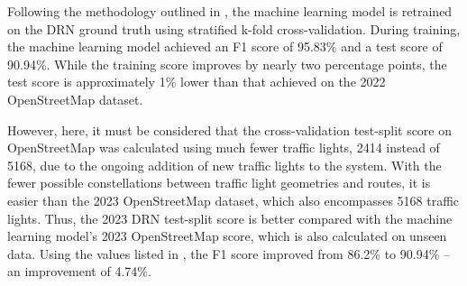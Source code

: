 \begin{table}[b]
\caption{Achieved model scores after retraining on DRN compared to preliminary results from . Cross-validation scores on unseen data are also highlighted.}
\label{tab:model-scores-drn}
\end{table}

Following the methodology outlined in , the machine learning model is retrained on the DRN ground truth using stratified k-fold cross-validation. During training, the machine learning model achieved an F1 score of 95.83\% and a test score of 90.94\%. While the training score improves by nearly two percentage points, the test score is approximately 1\% lower than that achieved on the 2022 OpenStreetMap dataset. 

However, here, it must be considered that the cross-validation test-split score on OpenStreetMap was calculated using much fewer traffic lights, 2414 instead of 5168, due to the ongoing addition of new traffic lights to the system. With the fewer possible constellations between traffic light geometries and routes, it is easier than the 2023 OpenStreetMap dataset, which also encompasses 5168 traffic lights. Thus, the 2023 DRN test-split score is better compared with the machine learning model's 2023 OpenStreetMap score, which is also calculated on unseen data. Using the values listed in , the F1 score improved from 86.2\% to 90.94\% -- an improvement of 4.74\%. 

